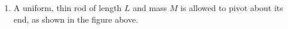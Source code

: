\begin{enumerate}
\item A uniform, thin rod of length $L$ and mass $M$ is allowed to pivot about
  its end, as shown in the figure above.
%    
%      
%    

\end{enumerate}
